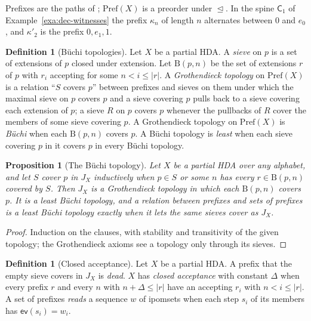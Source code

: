 \documentclass{lmcs}
\newtheorem{proposition}[theorem]{Proposition}
\theoremstyle{definition}
\newtheorem{definition}[theorem]{Definition}
\theoremstyle{remark}
\newcommand{\dimn}[1]{\lvert #1\rvert}
\newcommand{\ip}{\mathsf{ev}}
\newcommand{\Pref}{\mathrm{Pref}}
\newcommand{\ext}{\trianglelefteq}
\newcommand{\JX}[1]{J_{#1}}
\newcommand{\BB}{\mathrm{B}}
\providecommand{\wC}[1]{\mathsf{C}_{#1}}
\begin{document}
Prefixes are the paths of \cite{ZvGZ26}; $\Pref(X)$ is a preorder under
$\ext$. In the spine $\wC{1}$ of Example~\ref{exa:dec-witnesses} the
prefix $\kappa_n$ of length $n$ alternates between $0$ and $e_0$, and $\kappa'_2$ is the prefix
$0,e_1,1$.

\begin{definition}[B\"uchi topologies]\label{def:prefixes-site}
Let $X$ be a partial HDA. A \emph{sieve} on $p$ is a set of extensions of $p$ closed under
extension. Let $\BB(p,n)$ be the set of extensions $r$ of $p$ with $r_i$ accepting for some
$n<i\leq\dimn{r}$. A \emph{Grothendieck topology} on $\Pref(X)$ is a relation ``$S$ covers
$p$'' between prefixes and sieves on them under which the maximal sieve on $p$ covers $p$ and a sieve covering $p$
pulls back to a sieve covering each extension of $p$; a sieve $R$ on $p$ covers $p$ whenever the pullbacks of $R$
cover the members of some sieve covering $p$. A Grothendieck topology on $\Pref(X)$ is
\emph{B\"uchi} when each $\BB(p,n)$ covers $p$. A B\"uchi topology is \emph{least} when each
sieve covering $p$ in it covers $p$ in every B\"uchi topology.
\end{definition}

\begin{proposition}[The B\"uchi topology]\label{thm:jx}
Let $X$ be a partial HDA over any alphabet, and let $S$ cover $p$ in $\JX{X}$ inductively when $p\in S$ or some
$n$ has every $r\in\BB(p,n)$ covered by $S$. Then $\JX{X}$ is a Grothendieck
topology in which each $\BB(p,n)$ covers $p$.
It is a least B\"uchi topology, and a relation between prefixes and sets of prefixes
is a least B\"uchi topology exactly when it lets the same sieves cover as $\JX{X}$.
\end{proposition}

\begin{proof}
Induction on the clauses, with stability and transitivity of the given
topology; the Grothendieck axioms see a topology only through its
sieves.
\end{proof}

\begin{definition}[Closed acceptance]\label{def:closed}
Let $X$ be a partial HDA. A prefix that the empty sieve covers in $\JX{X}$ is \emph{dead}. $X$ has \emph{closed acceptance} with
constant $\Delta$ when every prefix $r$ and every $n$ with $n+\Delta\leq\dimn{r}$ have an accepting $r_i$ with
$n<i\leq\dimn{r}$. A set of prefixes \emph{reads} a sequence $w$ of ipomsets when each step
$s_i$ of its members has $\ip(s_i)=w_i$.
\end{definition}
\end{document}
